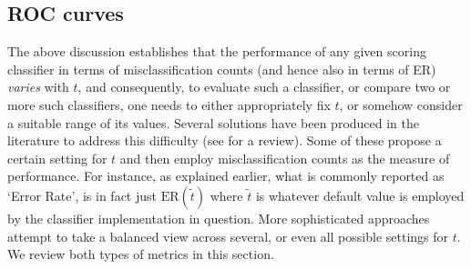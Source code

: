 \documentclass{article}
\begin{document}
\subsection{ROC curves}
The above discussion establishes that the performance of any given scoring classifier in terms of misclassification counts (and hence also in terms of ER) \emph{varies} with $t$, and consequently, to evaluate such a classifier, or compare two or more such classifiers, one needs to either appropriately fix $t$, or somehow consider a suitable range of its values. Several solutions have been produced in the literature to address this difficulty (see \cite{krzanowski2009} for a review). Some of these propose a certain setting for $t$ and then employ misclassification counts as the measure of performance. For instance, as explained earlier, what is commonly reported as `Error Rate', is in fact just $\text{ER}(\tilde{t})$ where $\tilde{t}$ is whatever default value is employed by the classifier implementation in question. More sophisticated approaches attempt to take a balanced view across several, or even all possible settings for $t$. We review both types of metrics in this section.
\end{document}
